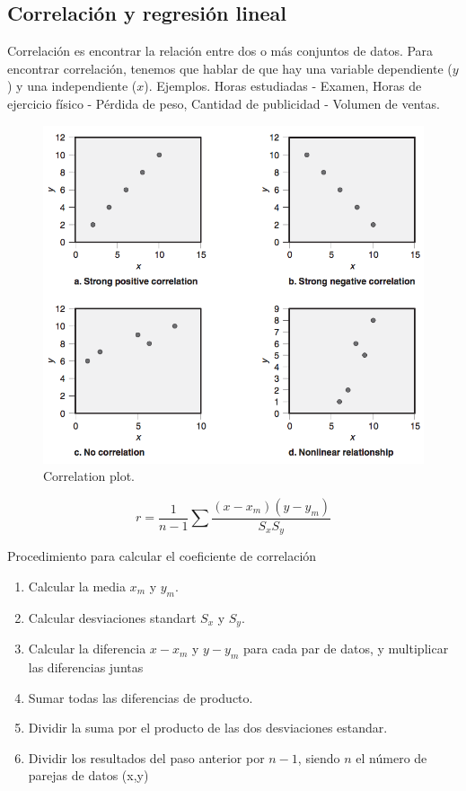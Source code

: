 \documentclass[]{article}
\begin{document}
\subsection{Correlación y regresión lineal}

Correlación es encontrar la relación entre dos o más conjuntos de datos. Para encontrar correlación, tenemos que hablar de que hay una variable dependiente ($y$) y una independiente ($x$). Ejemplos. Horas estudiadas - Examen, Horas de ejercicio físico - Pérdida de peso, Cantidad de publicidad - Volumen de ventas.

\begin{figure}[H]
	\centering
	\includegraphics[width=120mm]{imagenes/Correlation.png}
	\caption{Correlation plot.}
	\label{fig:Correlation}
\end{figure}

\begin{equation}
r = \frac{1}{n-1} \sum \frac{(x-x_m)(y-y_m)}{S_xS_y}
\end{equation}

Procedimiento para calcular el coeficiente de correlación

\begin{enumerate}
	\item Calcular la media $x_m$ y $y_m$.
	\item Calcular desviaciones standart $S_x$ y $S_y$.
	\item Calcular la diferencia $x-x_m$ y $y-y_m$ para cada par de datos, y multiplicar las diferencias juntas
	\item Sumar todas las diferencias de producto. 
	\item Dividir la suma por el producto de las dos desviaciones estandar. 
	\item Dividir los resultados del paso anterior por $n-1$, siendo $n$ el número de parejas de datos (x,y)
\end{enumerate}
\end{document}
